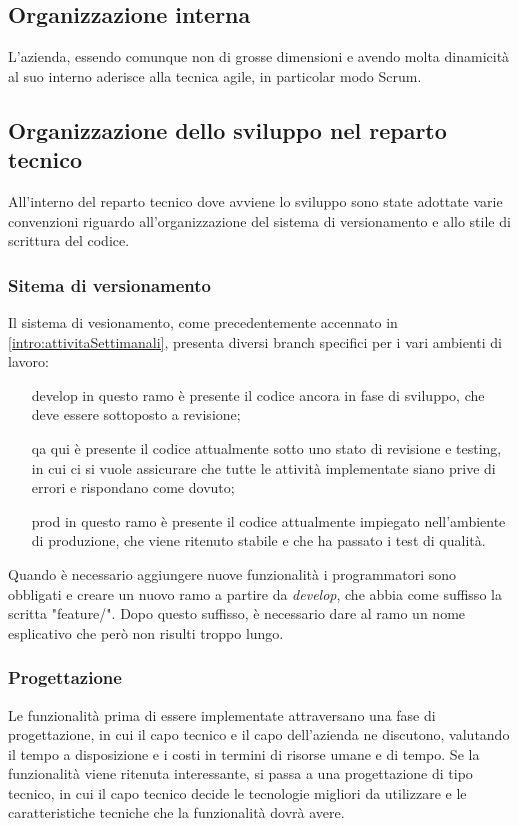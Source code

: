 \subsection{Organizzazione interna}

L'azienda, essendo comunque non di grosse dimensioni e avendo molta dinamicità
al suo interno aderisce alla tecnica agile, in particolar modo Scrum.

\subsection{Organizzazione dello sviluppo nel reparto tecnico}
\label{intro:OrganizzazioneSviluppoRepartoTecnico}
All'interno del reparto tecnico dove avviene lo sviluppo sono state
adottate varie convenzioni riguardo all'organizzazione del sistema di
versionamento e allo stile di scrittura del codice.

\subsubsection{Sitema di versionamento}
Il sistema di vesionamento, come precedentemente accennato in
\ref{intro:attivitaSettimanali}, presenta diversi branch specifici per i vari
ambienti di lavoro:
\begin{itemize}

\item[develop] in questo ramo è presente il codice ancora in fase di sviluppo,
che deve essere sottoposto a revisione;
\item[qa] qui è presente il codice attualmente sotto uno stato di revisione e
testing, in cui ci si vuole assicurare che tutte le attività implementate siano
prive di errori e rispondano come dovuto;
\item[prod] in questo ramo è presente il codice attualmente impiegato
nell'ambiente di produzione, che viene ritenuto stabile e che ha passato i test
di qualità.
\end{itemize}

Quando è necessario aggiungere nuove funzionalità i programmatori sono
obbligati e creare un nuovo ramo a partire da \textit{develop}, che abbia come
suffisso la scritta "feature/". Dopo questo suffisso, è necessario dare al ramo
un nome esplicativo che però non risulti troppo lungo.

\subsubsection{Progettazione}
Le funzionalità prima di essere implementate attraversano una fase di
progettazione, in cui il capo tecnico e il capo dell'azienda ne discutono,
valutando il tempo a disposizione e i costi in termini di risorse umane e di
tempo. Se la funzionalità viene ritenuta interessante, si passa a una
progettazione di tipo tecnico, in cui il capo tecnico decide le tecnologie
migliori da utilizzare e le caratteristiche tecniche che la funzionalità dovrà
avere.

